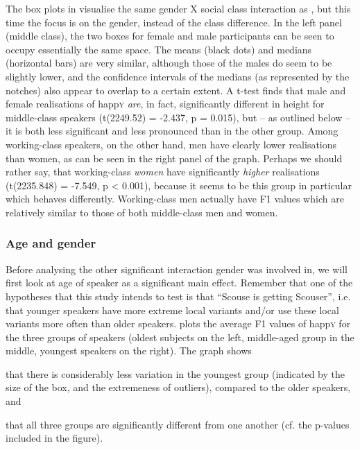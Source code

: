 The box plots in  visualise the same gender X social class interaction as , but this time the focus is on the gender, instead of the class difference.
In the left panel (middle class), the two boxes for female and male participants can be seen to occupy essentially the same space.
The means (black dots) and medians (horizontal bars) are very similar, although those of the males do seem to be slightly lower, and the confidence intervals of the medians (as represented by the notches) also appear to overlap to a certain extent.
A t-test finds that male and female realisations of happ\textsc{y} \emph{are}, in fact, significantly different in height for middle-class speakers (t(2249.52) = -2.437, p = 0.015), but -- as outlined below -- it is both less significant and less pronounced than in the other group.
Among working-class speakers, on the other hand, men have clearly lower realisations than women, as can be seen in the right panel of the graph.
Perhaps we should rather say, that working-class \emph{women} have significantly \emph{higher} realisations (t(2235.848) = -7.549, p < 0.001), because it seems to be this group in particular which behaves differently.
Working-class men actually have F1 values which are relatively similar to those of both middle-class men and women.

\subsubsection{Age and gender}
\label{sec.prod.res.vow.happy.f1.agegender}

Before analysing the other significant interaction gender was involved in, we will first look at age of speaker as a significant main effect.
Remember that one of the hypotheses that this study intends to test is that ``Scouse is getting Scouser'', i.e. that younger speakers have more extreme local variants and/or use these local variants more often than older speakers.
 plots the average F1 values of happ\textsc{y} for the three groups of speakers (oldest subjects on the left, middle-aged group in the middle, youngest speakers on the right).
The graph shows
\begin{inparaenum}[(a)]
	\item that there is considerably less variation in the youngest group (indicated by the size of the box, and the extremeness of outliers), compared to the older speakers, and
	\item that all three groups are significantly different from one another (cf. the p-values included in the figure).
\end{inparaenum}

